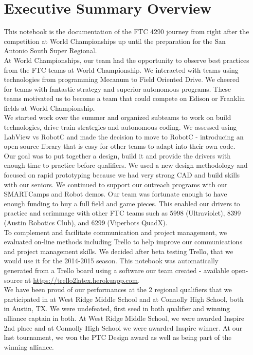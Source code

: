 \section{Executive Summary Overview}
This notebook is the documentation of the FTC 4290 journey from right after the competition at World Championships up until the preparation for the San Antonio South Super Regional.\\

At World Championships, our team had the opportunity to observe best practices from the FTC teams at World Championship. We interacted with teams using technologies from programming Mecanum to Field Oriented Drive. We cheered for teams with fantastic strategy and superior autonomous programs. These teams motivated us to become a team that could compete on Edison or Franklin fields at World Championship.\\

We started work over the summer and organized subteams to work on build technologies, drive train strategies and autonomous coding. We assessed using LabView vs RobotC and made the decision to move to RobotC - introducing an open-source library that is easy for other teams to adapt into their own code.  Our goal was to put together a design, build it and provide the drivers with enough time to practice before qualifiers. We used a new design methodology and focused on rapid prototyping because we had very strong CAD and build skills with our seniors. We continued to support our outreach programs with our SMARTCamps and Robot demos. Our team was fortunate enough to have enough funding to buy a full field and game pieces. This enabled our drivers to practice and scrimmage with other FTC teams such as 5998 (Ultraviolet), 8399 (Austin Robotics Club), and 6299 (Viperbots QuadX).\\

To complement and facilitate communication and project management, we evaluated on-line methods including Trello to help improve our communications and project management skills. We decided after beta testing Trello, that we would use it for the 2014-2015 season.  This notebook was automatically generated from a Trello board using a software our team created - available open-source at \url{https://trello2latex.herokuapp.com}.\\ 

We have been proud of our performances at the 2 regional qualifiers that we participated in at West Ridge Middle School and at Connolly High School, both in Austin, TX.  We were undefeated, first seed in both qualifier and winning alliance captain in both.  At West Ridge Middle School, we were awarded Inspire 2nd place and at Connolly High School we were awarded Inspire winner.  At our last tournament, we won the PTC Design award as well as being part of the winning alliance.\\

